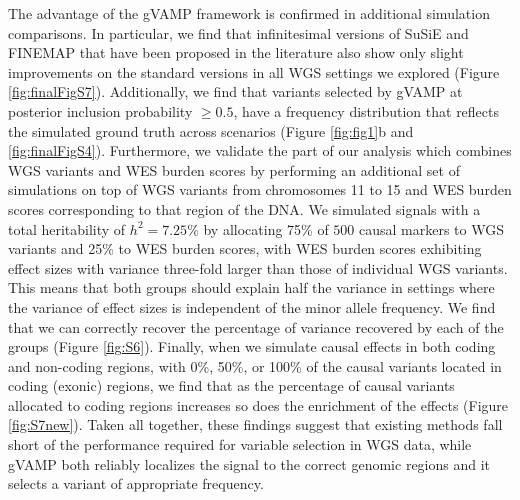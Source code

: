 The advantage of the gVAMP framework is confirmed in additional simulation comparisons. In particular, we find that infinitesimal versions of SuSiE and FINEMAP \cite{infinitesimalFineMapping2024} that have been proposed in the literature also show only slight improvements on the standard versions in all WGS settings we explored (Figure \ref{fig:finalFigS7}). Additionally, we find that variants selected by gVAMP at posterior inclusion probability $\geq 0.5$, have a frequency distribution that reflects the simulated ground truth across scenarios (Figure \ref{fig:fig1}b and \ref{fig:finalFigS4}). Furthermore, we validate the part of our analysis which combines WGS variants and WES burden scores by performing an additional set of simulations on top of WGS variants from chromosomes 11 to 15 and WES burden scores corresponding to that region of the DNA. We simulated signals with a total heritability of $h^2 = 7.25\%$ by allocating 75\% of $500$ causal markers to WGS variants and 25\% to WES burden scores, with WES burden scores exhibiting effect sizes with variance three-fold larger than those of individual WGS variants. This means that both groups should explain half the variance in settings where the variance of effect sizes is independent of the minor allele frequency. We find that we can correctly recover the percentage of variance recovered by each of the groups (Figure \ref{fig:S6}). Finally, when we simulate causal effects in both coding and non-coding regions, with 0\%, 50\%, or 100\% of the causal variants located in coding (exonic) regions, we find that as the percentage of causal variants allocated to coding regions increases so does the enrichment of the effects (Figure \ref{fig:S7new}). Taken all together, these findings suggest that existing methods fall short of the performance required for variable selection in WGS data, while gVAMP both reliably localizes the signal to the correct genomic regions and it selects a variant of appropriate frequency.

